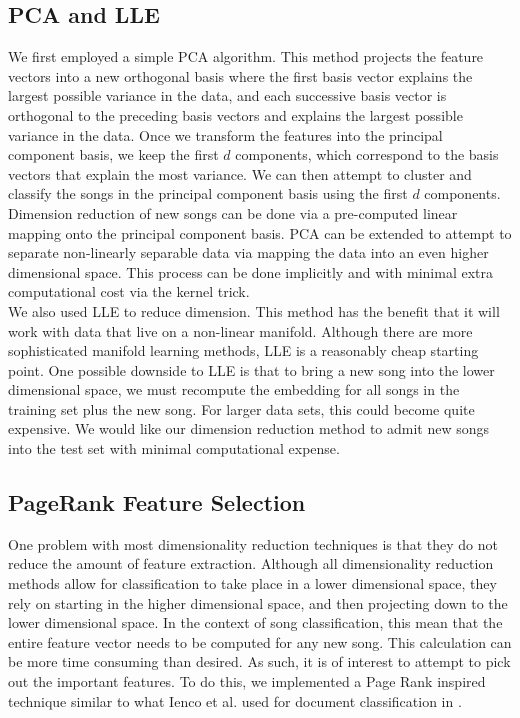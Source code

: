 \documentclass[12pt]{article}
\begin{document}
\subsection*{PCA and LLE}
We first employed a simple PCA algorithm.  This method projects the feature vectors into a new orthogonal basis where the first basis vector explains the largest possible variance in the data, and each successive basis vector is orthogonal to the preceding basis vectors and explains the largest possible variance in the data.  Once we transform the features into the principal component basis, we keep the first $d$ components, which correspond to the basis vectors that explain the most variance.  We can then attempt to cluster and classify the songs in the principal component basis using the first $d$ components.  Dimension reduction of new songs can be done via a pre-computed linear mapping onto the principal component basis.  PCA can be extended to attempt to separate non-linearly separable data via mapping the data into an even higher dimensional space.  This process can be done implicitly and with minimal extra computational cost via the kernel trick.\\


We also used LLE to reduce dimension.  This method has the benefit that it will work with data that live on a non-linear manifold.  Although there are more sophisticated manifold learning methods, LLE is a reasonably cheap starting point.  One possible downside to LLE is that to bring a new song into the lower dimensional space, we must recompute the embedding for all songs in the training set plus the new song.  For larger data sets, this could become quite expensive.  We would like our dimension reduction method to admit new songs into the test set with minimal computational expense.\\

\subsection*{PageRank Feature Selection}
One problem with most dimensionality reduction techniques is that they do not reduce the amount of feature extraction.  Although all dimensionality reduction methods allow for classification to take place in a lower dimensional space, they rely on starting in the higher dimensional space, and then projecting down to the lower dimensional space.  In the context of song classification, this mean that the entire feature vector needs to be computed for any new song.  This calculation can be more time consuming than desired.  As such, it is of interest to attempt to pick out the important features.  To do this, we implemented a Page Rank inspired technique similar to what Ienco et al. used for document classification in \cite{ieonco:pagerank}.
\end{document}
